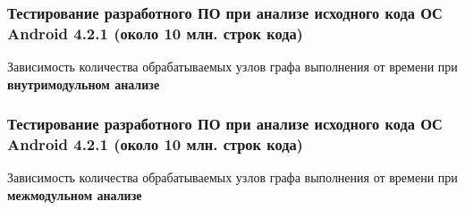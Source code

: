 \documentclass[hyperref={pdfpagelabels=false}]{beamer}
\begin{document}
\begin{frame}
\frametitle{Тестирование разработного ПО при анализе исходного кода ОС Android 4.2.1 (около 10 млн. строк кода)}
Зависимость количества обрабатываемых узлов графа выполнения от времени  при \textbf{внутримодульном анализе}
\begin{figure}[h]
\end{figure}
\end{frame}

\begin{frame}
\frametitle{Тестирование разработного ПО при анализе исходного кода ОС Android 4.2.1 (около 10 млн. строк кода)}
Зависимость количества обрабатываемых узлов графа выполнения от времени  при \textbf{межмодульном анализе}
\begin{figure}[h]
\end{figure}
\end{frame}
\end{document}

